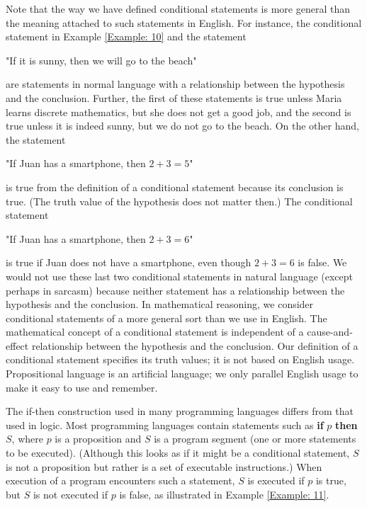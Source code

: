 \documentclass{Axon}
\begin{document}
Note that the way we have defined conditional statements is more general than the meaning attached to such statements in English. For instance, the conditional statement in Example \ref{Example: 10} and the statement
\begin{center}
    "If it is sunny, then we will go to the beach"
\end{center}
are statements in normal language with a relationship between the hypothesis and the conclusion. Further, the first of these statements is true unless Maria learns discrete mathematics, but she does not get a good job, and the second is true unless it is indeed sunny, but we do not go to the beach. On the other hand, the statement
\begin{center}
    "If Juan has a smartphone, then \(2 + 3 = 5\)"
\end{center}
is true from the definition of a conditional statement because its conclusion is true. (The truth value of the hypothesis does not matter then.) The conditional statement
\begin{center}
    "If Juan has a smartphone, then \(2 + 3 = 6\)"
\end{center}
is true if Juan does not have a smartphone, even though \(2 + 3 = 6\) is false. We would not use these last two conditional statements in natural language (except perhaps in sarcasm) because neither statement has a relationship between the hypothesis and the conclusion. In mathematical reasoning, we consider conditional statements of a more general sort than we use in English. The mathematical concept of a conditional statement is independent of a cause-and-effect relationship between the hypothesis and the conclusion. Our definition of a conditional statement specifies its truth values; it is not based on English usage. Propositional language is an artificial language; we only parallel English usage to make it easy to use and remember.

The if-then construction used in many programming languages differs from that used in logic. Most programming languages contain statements such as \textbf{if} \(p\) \textbf{then} \(S\), where \(p\) is a proposition and \(S\) is a program segment (one or more statements to be executed). (Although this looks as if it might be a conditional statement, \(S\) is not a proposition but rather is a set of executable instructions.) When execution of a program encounters such a statement, \(S\) is executed if \(p\) is true, but \(S\) is not executed if \(p\) is false, as illustrated in Example \ref{Example: 11}.
\end{document}
